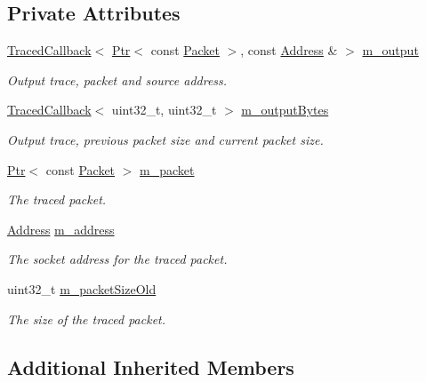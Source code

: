 \subsection*{Private Attributes}
\begin{DoxyCompactItemize}
\item 
\hyperlink{classns3_1_1TracedCallback}{Traced\+Callback}$<$ \hyperlink{classns3_1_1Ptr}{Ptr}$<$ const \hyperlink{classns3_1_1Packet}{Packet} $>$, const \hyperlink{classns3_1_1Address}{Address} \& $>$ \hyperlink{classns3_1_1ApplicationPacketProbe_a99aa065d8b1a089f6e3b5fb51cd66f9c}{m\+\_\+output}
\begin{DoxyCompactList}\small\item\em Output trace, packet and source address. \end{DoxyCompactList}\item 
\hyperlink{classns3_1_1TracedCallback}{Traced\+Callback}$<$ uint32\+\_\+t, uint32\+\_\+t $>$ \hyperlink{classns3_1_1ApplicationPacketProbe_a900aa5c6f1cd3b0c0f25f534e0866853}{m\+\_\+output\+Bytes}
\begin{DoxyCompactList}\small\item\em Output trace, previous packet size and current packet size. \end{DoxyCompactList}\item 
\hyperlink{classns3_1_1Ptr}{Ptr}$<$ const \hyperlink{classns3_1_1Packet}{Packet} $>$ \hyperlink{classns3_1_1ApplicationPacketProbe_a1b1bc6d7801f9b5d0de89cc24d24edfb}{m\+\_\+packet}
\begin{DoxyCompactList}\small\item\em The traced packet. \end{DoxyCompactList}\item 
\hyperlink{classns3_1_1Address}{Address} \hyperlink{classns3_1_1ApplicationPacketProbe_addc226991c69ccac086df131989114f5}{m\+\_\+address}
\begin{DoxyCompactList}\small\item\em The socket address for the traced packet. \end{DoxyCompactList}\item 
uint32\+\_\+t \hyperlink{classns3_1_1ApplicationPacketProbe_ad3ecd81e5fbd3b867eb1f46c5e8cfddb}{m\+\_\+packet\+Size\+Old}
\begin{DoxyCompactList}\small\item\em The size of the traced packet. \end{DoxyCompactList}\end{DoxyCompactItemize}
\subsection*{Additional Inherited Members}



